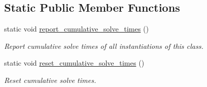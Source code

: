 \subsection*{Static Public Member Functions}
\begin{DoxyCompactItemize}
\item 
static void \hyperlink{classoomph_1_1HyprePreconditioner_aaca6bf7cf440f56ca8e901de64f1da9e}{report\+\_\+cumulative\+\_\+solve\+\_\+times} ()
\begin{DoxyCompactList}\small\item\em Report cumulative solve times of all instantiations of this class. \end{DoxyCompactList}\item 
static void \hyperlink{classoomph_1_1HyprePreconditioner_a126763a53b2c687bc1b150d0fc64fbb6}{reset\+\_\+cumulative\+\_\+solve\+\_\+times} ()
\begin{DoxyCompactList}\small\item\em Reset cumulative solve times. \end{DoxyCompactList}\end{DoxyCompactItemize}
